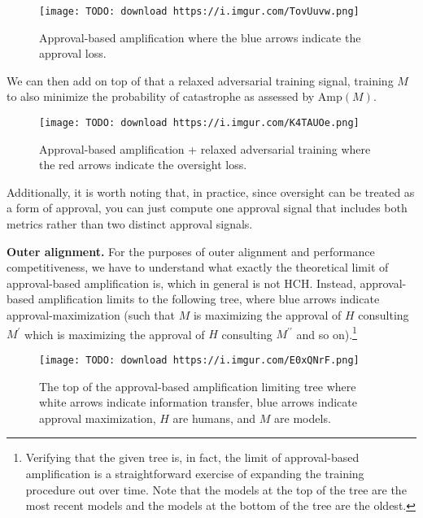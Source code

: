 \documentclass[
  onecolumn,
  natbib,
]{miri-tech-article}
\begin{document}
\begin{figure}[h!]
  \centering
  \texttt{[image: TODO: download https://i.imgur.com/TovUuvw.png]}
  \caption{Approval-based amplification where the blue arrows indicate the approval loss.}
\end{figure}

We can then add on top of that a relaxed adversarial training signal, training $M$ to also minimize the probability of catastrophe as assessed by $\text{Amp}(M)$.

\begin{figure}[h!]
  \centering
  \texttt{[image: TODO: download https://i.imgur.com/K4TAUOe.png]}
  \caption{Approval-based amplification + relaxed adversarial training where the red arrows indicate the oversight loss.}
\end{figure}

Additionally, it is worth noting that, in practice, since oversight can be treated as a form of approval, you can just compute one approval signal that includes both metrics rather than two distinct approval signals.

\textbf{Outer alignment.} For the purposes of outer alignment and performance competitiveness, we have to understand what exactly the theoretical limit of approval-based amplification is, which in general is not HCH. Instead, approval-based amplification limits to the following tree, where blue arrows indicate approval-maximization (such that $M$ is maximizing the approval of $H$ consulting $M^\prime$ which is maximizing the approval of $H$ consulting $M^{\prime\prime}$ and so on).\footnote{Verifying that the given tree is, in fact, the limit of approval-based amplification is a straightforward exercise of expanding the training procedure out over time. Note that the models at the top of the tree are the most recent models and the models at the bottom of the tree are the oldest.}

\begin{figure}[h!]
  \centering
  \texttt{[image: TODO: download https://i.imgur.com/E0xQNrF.png]}
  \caption{The top of the approval-based amplification limiting tree where white arrows indicate information transfer, blue arrows indicate approval maximization, $H$ are humans, and $M$ are models.}
\end{figure}
\end{document}
